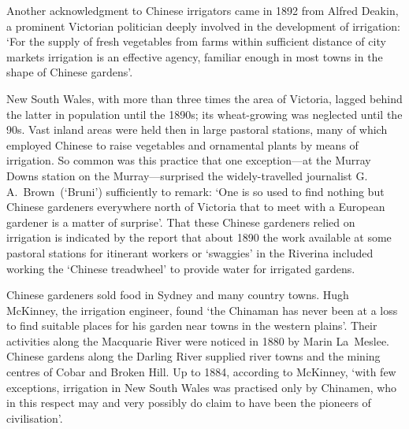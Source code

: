 Another acknowledgment to Chinese irrigators came in 1892 from Alfred
Deakin, a prominent Victorian politician deeply involved in the
development of irrigation: `For the supply of fresh vegetables from
farms within sufficient distance of city markets irrigation is an
effective agency, familiar enough in most towns in the shape of
Chinese gardens'.

New South Wales, with more than three times the area of Victoria,
lagged behind the latter in population until the 1890s; its
wheat-growing was neglected until the 90s.
Vast inland areas were held then in large pastoral stations, many of
which employed Chinese to raise vegetables and ornamental plants by
means of irrigation.
So common was this practice that one exception---at the Murray Downs
station on the Murray---surprised the widely-travelled journalist
G.\,A.~Brown~(`Bruni') sufficiently to remark: `One is so used to find
nothing but Chinese gardeners everywhere north of Victoria that to
meet with a European gardener is a matter of
surprise'.  That these Chinese
gardeners relied on irrigation is indicated by the report that about
1890 the work available at some pastoral stations for itinerant
workers or `swaggies' in the Riverina included working the `Chinese
treadwheel' to provide water for irrigated gardens.

Chinese gardeners sold food in Sydney and many country towns. Hugh
McKinney, the irrigation engineer, found `the Chinaman has never been
at a loss to find suitable places for his garden near towns in the
western plains'.  Their activities along the Macquarie River were noticed in
1880 by Marin La~Meslee.  Chinese gardens along the Darling River supplied river towns
and the mining centres of Cobar and Broken Hill.  Up to 1884,
according to McKinney, `with few exceptions, irrigation in New South
Wales was practised only by Chinamen, who in this respect may and very
possibly do claim to have been the pioneers of
civilisation'.

